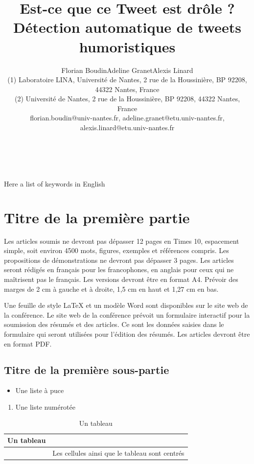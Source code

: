\documentclass[10pt,a4paper,twoside]{article}
\title{Est-ce que ce Tweet est drôle ? Détection automatique de tweets humoristiques}
\author{Florian Boudin\up{1}\quad Adeline Granet\up{2}\quad Alexis Linard\up{2}\\
  (1) Laboratoire LINA, Université de Nantes, 2 rue de la Houssinière, BP 92208, 44322 Nantes, France \\ 
  (2) Université de Nantes, 2 rue de la Houssinière, BP 92208, 44322 Nantes, France\\ 
  florian.boudin@univ-nantes.fr, adeline.granet@etu.univ-nantes.fr, alexis.linard@etu.univ-nantes.fr \\ 
}
\begin{document}
\maketitle


\\

\\

{Here a list of keywords in English}


\section{Titre de la première partie}

Les articles soumis ne devront pas dépasser 12 pages en Times 10, espacement simple, soit environ 4500 mots, figures, exemples et références compris. Les propositions de démonstrations ne devront pas dépasser 3 pages. Les articles seront rédigés en français pour les francophones, en anglais pour ceux qui ne maîtrisent pas le français. Les versions devront être en format A4. Prévoir des marges de 2 cm à gauche et à droite, 1,5 cm en haut et 1,27 cm en bas.

Une feuille de style LaTeX et un modèle Word sont disponibles sur le site web de la conférence. Le site web de la conférence prévoit un formulaire interactif pour la soumission des résumés et des articles. Ce sont les données saisies dans le formulaire qui seront utilisées pour l'édition des résumés. Les articles devront être en format PDF. 


\subsection{Titre de la première sous-partie}
\begin{itemize}
\item Une liste à puce 
\end{itemize}
\begin{enumerate}
\item Une liste numérotée
\end{enumerate}

\begin{table}[!h]
\centering
	\begin{tabular}{|c|p{4cm}|}
	\hline
	Un tableau&\\
	\hline
	&Les cellules ainsi que le tableau sont centrés\\
	\hline
	\end{tabular}
\caption{Un tableau}
\end{table}
\end{document}
